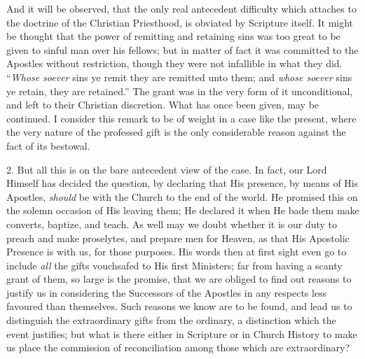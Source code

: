 And it will be observed, that the only real antecedent difficulty
which attaches to the doctrine of the Christian Priesthood, is obviated
by Scripture itself. It might be thought that the power of remitting and
retaining sins was too great to be given to sinful man over his fellows;
but in matter of fact it was committed to the Apostles without
restriction, though they were not infallible in what they did. ``\emph{Whose
soever} sins ye remit they are remitted unto them; and \emph{whose
soever} sins ye retain, they are retained.'' The grant was in the
very form of it unconditional, and left to their Christian discretion.
What has once been given, may be continued. I consider this remark to be
of weight in a case like the present, where the very nature of the
professed gift is the only considerable reason against the fact of its
bestowal.

2. But all this is on the bare antecedent view of the case. In fact,
our Lord Himself has decided the question, by declaring that His
presence, by means of His Apostles, \emph{should} be with the Church to
the end of the world. He promised this on the solemn occasion of His
leaving them; He declared it when He bade them make converts, baptize,
and teach. As well may we doubt whether it is our duty to preach and
make proselytes, and prepare men for Heaven, as that His Apostolic
Presence is with us, for those purposes. His words then at first sight
even go to include \emph{all} the gifts vouchsafed to His first
Ministers; far from having a scanty grant of them, so large is the
promise, that we are obliged to find out reasons to justify us in
considering the Successors of the Apostles in any respects less favoured
than themselves. Such reasons we know are to be found, and lead us to
distinguish the extraordinary gifts from the ordinary, a distinction
which the event justifies; but what is there either in Scripture or in
Church History to make us place the commission of reconciliation among
those which are extraordinary?

